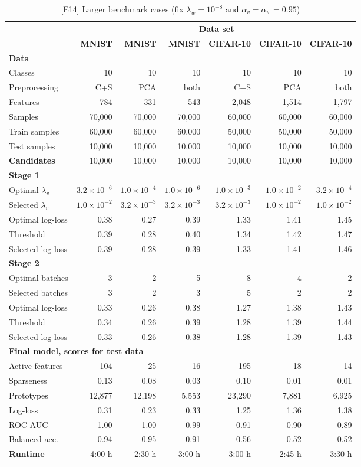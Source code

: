 %
\begin{table}
\caption{[E14] Larger benchmark cases (fix $\lambda_w=10^{-8}$ and $\alpha_v=\alpha_w=0.95$)}
\label{tab_e14}
%
\begin{center}
\small
\begin{tabular}{|lrrrrrr|}
\hline
&\multicolumn{6}{c|}{\textbf{\hrulefill\ Data set \hrulefill}}\\
&\textbf{MNIST}&\textbf{MNIST}&\textbf{MNIST}&\textbf{CIFAR-10}&\textbf{CIFAR-10}&\textbf{CIFAR-10}\\
\multicolumn{7}{|l|}{\textbf{Data}}\\
Classes&10&10&10&10&10&10\\
Preprocessing&C+S&PCA&both&C+S&PCA&both\\
Features&784&331&543&2,048&1,514&1,797\\
Samples&70,000&70,000&70,000&60,000&60,000&60,000\\
Train samples&60,000&60,000&60,000&50,000&50,000&50,000\\
Test samples&10,000&10,000&10,000&10,000&10,000&10,000\\
\textbf{Candidates}&10,000&10,000&10,000&10,000&10,000&10,000\\
\multicolumn{7}{|l|}{\textbf{Stage 1}}\\
Optimal $\lambda_v$&$3.2\times10^{-6}$&$1.0\times10^{-4}$&$1.0\times10^{-6}$&$1.0\times10^{-3}$&$1.0\times10^{-2}$&$3.2\times10^{-4}$\\
Selected $\lambda_v$&$1.0\times10^{-2}$&$3.2\times10^{-3}$&$3.2\times10^{-3}$&$3.2\times10^{-3}$&$1.0\times10^{-2}$&$1.0\times10^{-2}$\\
Optimal log-loss&0.38&0.27&0.39&1.33&1.41&1.45\\
Threshold&0.39&0.28&0.40&1.34&1.42&1.47\\
Selected log-loss&0.39&0.28&0.39&1.33&1.41&1.46\\
\multicolumn{7}{|l|}{\textbf{Stage 2}}\\
Optimal batches&3&2&5&8&4&2\\
Selected batches&3&2&3&5&2&2\\
Optimal log-loss&0.33&0.26&0.38&1.27&1.38&1.43\\
Threshold&0.34&0.26&0.39&1.28&1.39&1.44\\
Selected log-loss&0.33&0.26&0.38&1.28&1.39&1.43\\
\multicolumn{7}{|l|}{\textbf{Final model, scores for test data}}\\
Active features&104&25&16&195&18&14\\
Sparseness&0.13&0.08&0.03&0.10&0.01&0.01\\
Prototypes&12,877&12,198&5,553&23,290&7,881&6,925\\
Log-loss&0.31&0.23&0.33&1.25&1.36&1.38\\
ROC-AUC&1.00&1.00&0.99&0.91&0.90&0.89\\
Balanced acc.&0.94&0.95&0.91&0.56&0.52&0.52\\
\textbf{Runtime}&4:00 h&2:30 h&3:00 h&3:00 h&2:45 h&3:30 h\\
\hline
\end{tabular}
\end{center}
\end{table}
